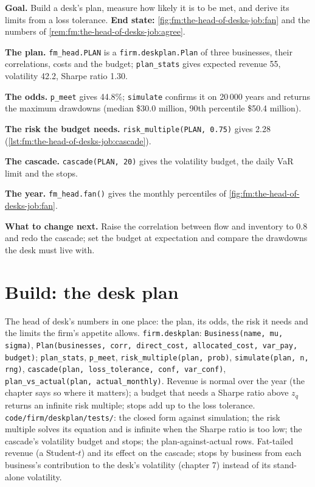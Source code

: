 \begin{tutorial}
\textbf{Goal.} Build a desk's plan, measure how likely it is to be met, and derive its limits from a loss tolerance. \textbf{End state:}
\cref{fig:fm:the-head-of-desks-job:fan} and the numbers of \cref{rem:fm:the-head-of-desks-job:agree}.
\begin{tutsteps}
\item \textbf{The plan.} \texttt{fm\_head.PLAN} is a \texttt{firm.deskplan.Plan} of three businesses, their correlations, costs and the
budget; \texttt{plan\_stats} gives expected revenue 55, volatility 42.2, Sharpe ratio 1.30.
\item \textbf{The odds.} \texttt{p\_meet} gives 44.8\%; \texttt{simulate} confirms it on 20\,000 years and returns the maximum drawdowns (median
\$30.0 million, 90th percentile \$50.4 million).
\item \textbf{The risk the budget needs.} \texttt{risk\_multiple(PLAN, 0.75)} gives 2.28 (\cref{lst:fm:the-head-of-desks-job:cascade}).
\item \textbf{The cascade.} \texttt{cascade(PLAN, 20)} gives the volatility budget, the daily VaR limit and the stops.
\item \textbf{The year.} \texttt{fm\_head.fan()} gives the monthly percentiles of \cref{fig:fm:the-head-of-desks-job:fan}.
\end{tutsteps}
\end{tutorial}

\textbf{What to change next.} Raise the correlation between flow and inventory to 0.8 and redo the cascade; set the budget at expectation and
compare the drawdowns the desk must live with.

\section{Build: the desk plan}\label{bld:fm:the-head-of-desks-job:deskplan}

\begin{build}
 The head of desk's numbers in one place: the plan, its odds, the risk it needs and the limits the firm's appetite allows.
 \texttt{firm.deskplan}: \texttt{Business(name, mu, sigma)}, \texttt{Plan(businesses, corr, direct\_cost, allocated\_cost,
var\_pay, budget)}; \texttt{plan\_stats}, \texttt{p\_meet}, \texttt{risk\_multiple(plan, prob)}, \texttt{simulate(plan, n, rng)},
\texttt{cascade(plan, loss\_tolerance, conf, var\_conf)}, \texttt{plan\_vs\_actual(plan, actual\_monthly)}.
 Revenue is normal over the year (the chapter says so where it matters); a budget that needs a Sharpe ratio above $z_q$ returns an
infinite risk multiple; stops add up to the loss tolerance.
 \texttt{code/firm/deskplan/tests/}: the closed form against simulation; the risk multiple solves its equation and
is infinite when the Sharpe ratio is too low; the cascade's volatility budget and stops; the plan-against-actual rows.
 Fat-tailed revenue (a Student-$t$) and its effect on the cascade; stops by business from each business's contribution to the
desk's volatility (chapter 7) instead of its stand-alone volatility.
\end{build}

